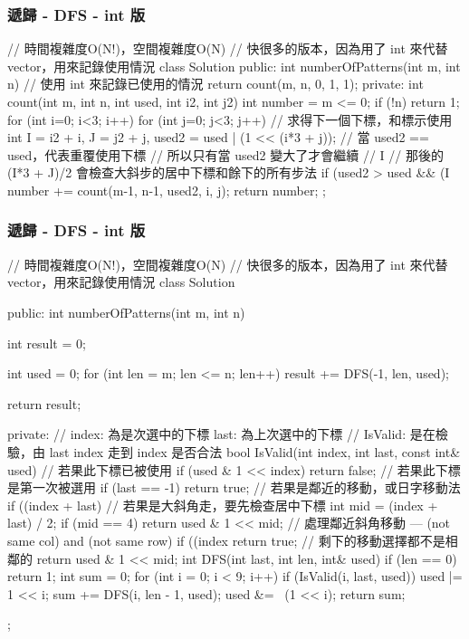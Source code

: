 \subsubsection{遞歸 - DFS - int 版}
\begin{Code}
// 時間複雜度O(N!)，空間複雜度O(N)
// 快很多的版本，因為用了 int 來代替 vector，用來記錄使用情況
class Solution {
public:
    int numberOfPatterns(int m, int n) {
        // 使用 int 來記錄已使用的情況
        return count(m, n, 0, 1, 1);
    }
private:
    int count(int m, int n, int used, int i2, int j2) {
        int number = m <= 0;
        if (!n) return 1;
        for (int i=0; i<3; i++) {
            for (int j=0; j<3; j++) {
                // 求得下一個下標，和標示使用
                int I = i2 + i, J = j2 + j, used2 = used | (1 << (i*3 + j));
                // 當 used2 == used，代表重覆使用下標
                // 所以只有當 used2 變大了才會繼續
                // I %
                // 那後的 (I*3 + J)/2 會檢查大斜步的居中下標和餘下的所有步法
                if (used2 > used && (I %
                    number += count(m-1, n-1, used2, i, j);
            }
        }
        return number;
    }
};
\end{Code}

\subsubsection{遞歸 - DFS - int 版}
\begin{Code}
// 時間複雜度O(N!)，空間複雜度O(N)
// 快很多的版本，因為用了 int 來代替 vector，用來記錄使用情況
class Solution {
public:
    int numberOfPatterns(int m, int n) {
        int result = 0;

        int used = 0;
        for (int len = m; len <= n; len++)
            result += DFS(-1, len, used);

        return result;
    }
private:
    // index: 為是次選中的下標 last: 為上次選中的下標
    // IsValid: 是在檢驗，由 last index 走到 index 是否合法
    bool IsValid(int index, int last, const int& used)
    {
        // 若果此下標已被使用
        if (used & 1 << index) return false;
        // 若果此下標是第一次被選用
        if (last == -1) return true;
        // 若果是鄰近的移動，或日字移動法
        if ((index + last) %
        // 若果是大斜角走，要先檢查居中下標
        int mid = (index + last) / 2;
        if (mid == 4) return used & 1 << mid;
        // 處理鄰近斜角移動 --- (not same col) and (not same row)
        if ((index %
            return true;
        // 剩下的移動選擇都不是相鄰的
        return used & 1 << mid;
    }
    int DFS(int last, int len, int& used)
    {
        if (len == 0)
            return 1;
        int sum = 0;
        for (int i = 0; i < 9; i++)
        {
            if (IsValid(i, last, used))
            {
                used |= 1 << i;
                sum += DFS(i, len - 1, used);
                used &= ~(1 << i);
            }
        }
        return sum;
    }
};
\end{Code}

